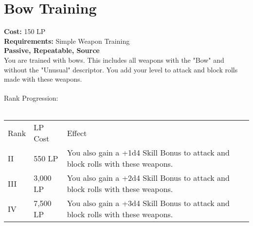 \section{Bow Training}\label{perk:bowTraining}
\textbf{Cost:} 150 LP\\
\textbf{Requirements:} Simple Weapon Training\\
\textbf{Passive, Repeatable, Source}\\
You are trained with bows.
This includes all weapons with the "Bow" and without the "Unusual" descriptor.
You add your level to attack and block rolls made with these weapons.\\
\\
Rank Progression:\\
\\
\begin{longtable}{l | l | p{9cm}}
	Rank & LP Cost & Effect\\
	II & 550 LP & You also gain a +1d4 Skill Bonus to attack and block rolls with these weapons.\\
	III & 3,000 LP & You also gain a +2d4 Skill Bonus to attack and block rolls with these weapons.\\
	IV & 7,500 LP & You also gain a +3d4 Skill Bonus to attack and block rolls with these weapons.\\
\end{longtable}